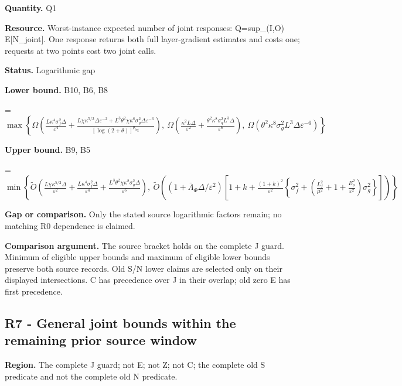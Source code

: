 \documentclass[10pt,a4paper]{article}
\newcommand{\AtlasMath}[1]{\par\begingroup\centering\setbox0=\hbox{$\displaystyle #1$}\ifdim\wd0>1.4\linewidth\typeout{ATLAS WIDE FORMULA: \the\wd0}\fi\ifdim\wd0>\linewidth\resizebox{\linewidth}{!}{\box0}\else\box0\fi\par\endgroup}
\begin{document}
\textbf{Quantity.} Q1



\textbf{Resource.} Worst-instance expected number of joint responses: Q=sup\_(I,O) E[N\_joint]. One response returns both full layer-gradient estimates and costs one; requests at two points cost two joint calls.



\textbf{Status.} Logarithmic gap



\textbf{Lower bound.} B10, B6, B8



\AtlasMath{\max\left\{\Omega\!\left(\frac{L\kappa^4\sigma_f^2\Delta}{\varepsilon^4}+\frac{L\chi\kappa^{5/2}\Delta\varepsilon^{-2}+L^3\theta^2\chi\kappa^8\sigma_g^2\Delta\varepsilon^{-6}}{[\log(2+\theta)]^{p_{\log}}}\right),\ \Omega\!\left(\frac{\kappa^2L\Delta}{\varepsilon^2}+\frac{\theta^2\kappa^8\sigma_g^2L^3\Delta}{\varepsilon^6}\right),\ \Omega(\theta^2\kappa^8\sigma_g^2L^3\Delta\varepsilon^{-6})\right\}}


\textbf{Upper bound.} B9, B5



\AtlasMath{\min\left\{\widetilde O\!\left(\frac{L\chi\kappa^{5/2}\Delta}{\varepsilon^2}+\frac{L\kappa^4\sigma_f^2\Delta}{\varepsilon^4}+\frac{L^3\theta^2\chi\kappa^8\sigma_g^2\Delta}{\varepsilon^6}\right),\ \widetilde O\!\left((1+\bar\Lambda_\Phi\Delta/\varepsilon^2)\left[1+k+\frac{(1+k)^2}{\varepsilon^2}\left\{\sigma_f^2+\left(\frac{L_f^2}{\mu^2}+1+\frac{E_\rho^2}{\varepsilon^2}\right)\sigma_g^2\right\}\right]\right)\right\}}


\textbf{Gap or comparison.} Only the stated source logarithmic factors remain; no matching R0 dependence is claimed.



\textbf{Comparison argument.} The source bracket holds on the complete J guard. Minimum of eligible upper bounds and maximum of eligible lower bounds preserve both source records. Old S/N lower claims are selected only on their displayed intersections. C has precedence over J in their overlap; old zero E has first precedence.



\subsection{R7 - General joint bounds within the remaining prior source window}


\textbf{Region.} The complete J guard; not E; not Z; not C; the complete old S predicate and not the complete old N predicate.
\end{document}
